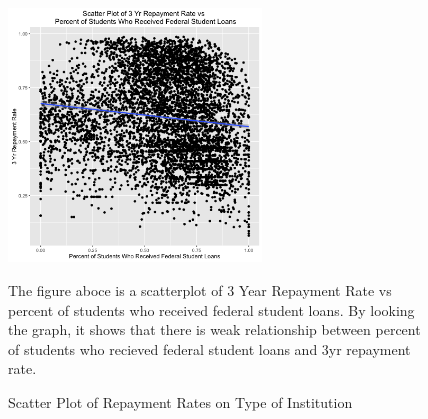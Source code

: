 \documentclass[a4paper]{article}\usepackage[]{graphicx}\usepackage[]{color}
\begin{document}
\begin{figure}
  \caption{Scatter Plot of Repayment Rates on Type of Institution}
  \centering
  \includegraphics[width=0.6\textwidth]{../images/eda/pctfloan_rpy3yr_scatter}
  \centering
  \newline
  
  \raggedright
The figure aboce is a scatterplot of 3 Year Repayment Rate vs percent of students who received federal student loans. By looking the graph, it shows that there is weak relationship between percent of students who recieved federal student loans and 3yr repayment rate.
\end{figure}
\end{document}
